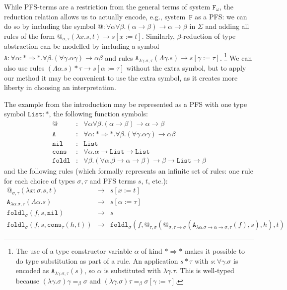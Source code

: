 \documentclass[a4paper,UKenglish,cleveref,autoref,numberwithinsect]{lipics-v2019}
\theoremstyle{definition}
\newcommand{\Fomega}{\mathtt{F}_\omega}
\newcommand{\arrkind}{\Rightarrow}
\newcommand{\arrtype}{\rightarrow}
\newcommand{\quant}[2]{\forall #1.#2}
\newcommand{\abs}[2]{\lambda #1.#2}
\newcommand{\tabs}[2]{\Lambda #1.#2}
\newcommand{\red}{\longrightarrow}
\newcommand{\List}{\mathtt{List}}
\newcommand{\nil}{\mathtt{nil}}
\newcommand{\cons}{\mathtt{cons}}
\begin{document}
While PFS-terms are a restriction from the general terms
of system $\Fomega$, the reduction relation allows us to actually encode,
e.g., system~$\mathtt{F}$ as a PFS: we can do so by including the symbol
${@} : \forall\alpha\forall\beta . (\alpha \arrtype \beta) \arrtype \alpha
\arrtype \beta$ in $\Sigma$ and adding all rules of the form
$@_{\sigma,\tau}(\abs{x}{s},t) \red s[x:=t]$.
Similarly, $\beta$-reduction of type abstraction can be modelled
by including a symbol
$\mathtt{A} : \forall \alpha : * \arrkind * . \forall \beta . (\forall
\gamma.\alpha \gamma) \arrtype \alpha \beta$ and rules
$\mathtt{A}_{\abs{\gamma}{\sigma},\tau}(\tabs{\gamma}{s}) \red s[\gamma:=\tau]$.%
  \footnote{The use of a type constructor variable $\alpha$ of kind
  $* \arrkind *$ makes it possible to do type substitution as part of
  a rule.
  An application $s * \tau$ with $s : \quant{\gamma}{\sigma}$ is
  encoded as $\mathtt{A}_{\abs{\gamma}{\sigma},\tau}(s)$, so
  $\alpha$ is substituted with $\abs{\gamma}{\tau}$.
  This is well-typed because $(\abs{\gamma}{\sigma})\gamma =_\beta
  \sigma$ and $(\abs{\gamma}{\sigma})\tau =_\beta \sigma[\gamma:=\tau]$.
  }
We can also use rules
$(\tabs{\alpha}{s})*\tau \red s[\alpha:=\tau]$ without the extra
symbol, but to apply our method it may be
convenient
to use the extra symbol, as
it creates more liberty in choosing an interpretation.

\begin{example}\label{ex_fold_pafs}
  The example from the introduction may be represented as a PFS with
  one type symbol $\mathtt{List} : *$, the following function symbols:
  \[
  \begin{array}{rcl}
    @ & : & \forall \alpha \forall \beta . (\alpha \arrtype \beta) \arrtype \alpha \arrtype \beta \\
    \mathtt{A} & : & \forall \alpha : * \arrkind * . \forall \beta .
    (\forall \gamma .\alpha \gamma) \arrtype \alpha \beta \\
    \mathtt{nil} & : & \List \\
    \mathtt{cons} & : & \forall \alpha . \alpha \arrtype \List \arrtype \List \\
    \mathtt{foldl} & : & \forall \beta . (\forall \alpha . \beta \arrtype \alpha \arrtype \beta) \arrtype \beta \arrtype \List \arrtype \beta
  \end{array}
  \]
  and the following rules (which formally represents an
  infinite set of rules: one rule for each choice of types $\sigma,
  \tau$ and PFS terms $s$, $t$, etc.):
  \[
  \begin{array}{rcl}
    @_{\sigma,\tau}(\abs{x:\sigma}{s},t) & \red & s[x:=t] \\
    \mathtt{A}_{\abs{\alpha}{\sigma},\tau}(\tabs{\alpha}{s}) & \red &
    s[\alpha:=\tau] \\
    \mathtt{foldl}_\sigma(f,s,\nil) & \red & s \\
    \mathtt{foldl}_\sigma(f,s,\cons_\tau(h,t)) & \red & \mathtt{foldl}_\sigma(f,@_{\tau,\sigma}(@_{\sigma,\tau
    \arrtype\sigma}(\mathtt{A}_{\abs{\alpha}{\sigma\arrtype\alpha\arrtype\sigma},\tau}(f),s),h),t)
  \end{array}
  \]
\end{example}
\end{document}
